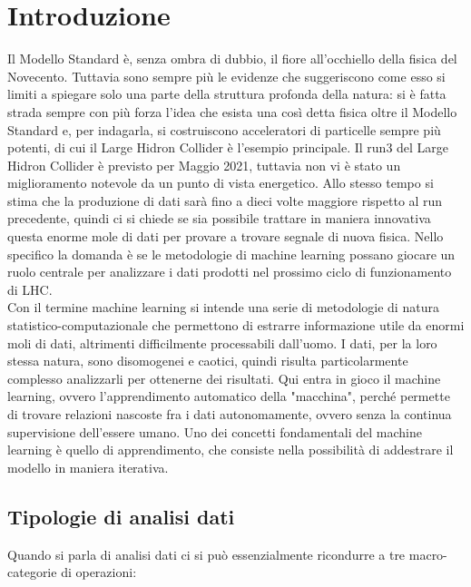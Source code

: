 %
\section{Introduzione}\label{sec:introduzione}
%
Il Modello Standard è, senza ombra di dubbio, il fiore all'occhiello della fisica del Novecento. Tuttavia sono sempre più le evidenze che suggeriscono come esso si limiti a spiegare solo una parte della struttura profonda della natura: si è fatta strada sempre con più forza l'idea che esista una così detta fisica oltre il Modello Standard e, per indagarla, si costruiscono acceleratori di particelle sempre più potenti, di cui il Large Hidron Collider è l'esempio principale. 
Il run3 del Large Hidron Collider è previsto per Maggio 2021, tuttavia non vi è stato un miglioramento notevole da un punto di vista energetico. Allo stesso tempo si stima che la produzione di dati sarà fino a dieci volte maggiore rispetto al run precedente, quindi ci si chiede se sia possibile trattare in maniera innovativa questa enorme mole di dati per provare a trovare segnale di nuova fisica. Nello specifico la domanda è se le metodologie di machine learning possano giocare un ruolo centrale per analizzare i dati prodotti nel prossimo ciclo di funzionamento di LHC.\\
Con il termine machine learning si intende una serie di metodologie di natura statistico-computazionale che permettono di estrarre informazione utile da enormi moli di dati, altrimenti difficilmente processabili dall'uomo.
I dati, per la loro stessa natura, sono disomogenei e caotici, quindi risulta particolarmente complesso analizzarli per ottenerne dei risultati. Qui entra in gioco il machine learning, ovvero l'apprendimento automatico della "macchina", perché permette di trovare relazioni nascoste fra i dati autonomamente, ovvero senza la continua supervisione dell'essere umano. Uno dei concetti fondamentali del machine learning è quello di apprendimento, che consiste nella possibilità di addestrare il modello in maniera iterativa. \\

\newpage


\subsection{Tipologie di analisi dati}
\label{subsec:tipologie analisi dati}

	Quando si parla di analisi dati ci si può essenzialmente ricondurre a tre macro-categorie di operazioni:
	
